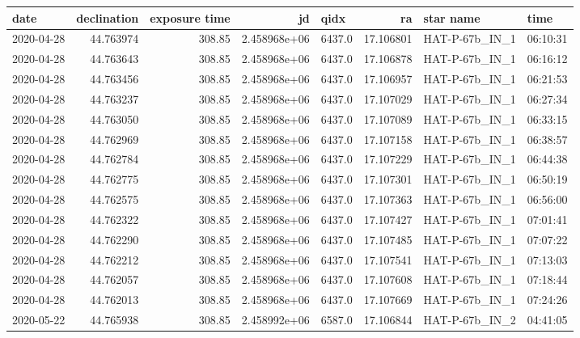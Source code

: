 \documentclass[modern]{aastex631}
\begin{document}
\begin{tabular}{lrrrlrll}
    \toprule
    date       & declination & exposure time & jd           & qidx   & ra        & star name                  & time     \\
    \midrule
    2020-04-28 & 44.763974   & 308.85        & 2.458968e+06 & 6437.0 & 17.106801 & HAT-P-67b\_IN\_1           & 06:10:31 \\
    2020-04-28 & 44.763643   & 308.85        & 2.458968e+06 & 6437.0 & 17.106878 & HAT-P-67b\_IN\_1           & 06:16:12 \\
    2020-04-28 & 44.763456   & 308.85        & 2.458968e+06 & 6437.0 & 17.106957 & HAT-P-67b\_IN\_1           & 06:21:53 \\
    2020-04-28 & 44.763237   & 308.85        & 2.458968e+06 & 6437.0 & 17.107029 & HAT-P-67b\_IN\_1           & 06:27:34 \\
    2020-04-28 & 44.763050   & 308.85        & 2.458968e+06 & 6437.0 & 17.107089 & HAT-P-67b\_IN\_1           & 06:33:15 \\
    2020-04-28 & 44.762969   & 308.85        & 2.458968e+06 & 6437.0 & 17.107158 & HAT-P-67b\_IN\_1           & 06:38:57 \\
    2020-04-28 & 44.762784   & 308.85        & 2.458968e+06 & 6437.0 & 17.107229 & HAT-P-67b\_IN\_1           & 06:44:38 \\
    2020-04-28 & 44.762775   & 308.85        & 2.458968e+06 & 6437.0 & 17.107301 & HAT-P-67b\_IN\_1           & 06:50:19 \\
    2020-04-28 & 44.762575   & 308.85        & 2.458968e+06 & 6437.0 & 17.107363 & HAT-P-67b\_IN\_1           & 06:56:00 \\
    2020-04-28 & 44.762322   & 308.85        & 2.458968e+06 & 6437.0 & 17.107427 & HAT-P-67b\_IN\_1           & 07:01:41 \\
    2020-04-28 & 44.762290   & 308.85        & 2.458968e+06 & 6437.0 & 17.107485 & HAT-P-67b\_IN\_1           & 07:07:22 \\
    2020-04-28 & 44.762212   & 308.85        & 2.458968e+06 & 6437.0 & 17.107541 & HAT-P-67b\_IN\_1           & 07:13:03 \\
    2020-04-28 & 44.762057   & 308.85        & 2.458968e+06 & 6437.0 & 17.107608 & HAT-P-67b\_IN\_1           & 07:18:44 \\
    2020-04-28 & 44.762013   & 308.85        & 2.458968e+06 & 6437.0 & 17.107669 & HAT-P-67b\_IN\_1           & 07:24:26 \\
    2020-05-22 & 44.765938   & 308.85        & 2.458992e+06 & 6587.0 & 17.106844 & HAT-P-67b\_IN\_2           & 04:41:05 \\

\end{tabular}
\end{document}
